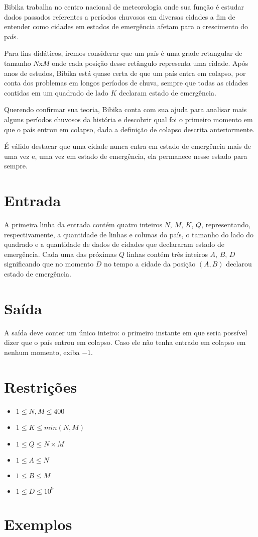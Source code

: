 Bibika trabalha no centro nacional de meteorologia onde sua função é estudar dados passados referentes a períodos chuvosos em diversas cidades a
fim de entender como cidades em estados de emergência afetam para o crescimento do país.

Para fins didáticos, iremos considerar que um país é uma grade retangular de tamanho $N$x$M$ onde cada posição desse retângulo representa uma cidade.
Após anos de estudos, Bibika está quase certa de que um país entra em colapso, por conta dos problemas em longos períodos de chuva, sempre que todas
as cidades contidas em um quadrado de lado $K$ declaram estado de emergência.

Querendo confirmar sua teoria, Bibika conta com sua ajuda para analisar mais alguns períodos chuvosos da história e descobrir qual foi o primeiro momento
em que o país entrou em colapso, dada a definição de colapso descrita anteriormente.

É válido destacar que uma cidade nunca entra em estado de emergência mais de uma vez e, uma vez em estado de emergência, ela permanece nesse estado para sempre.

\section*{Entrada}

A primeira linha da entrada contém quatro inteiros $N$, $M$, $K$, $Q$, representando, respectivamente, a quantidade de linhas e colunas do país,
o tamanho do lado do quadrado e a quantidade de dados de cidades que declararam estado de emergência.
Cada uma das próximas $Q$ linhas contém três inteiros $A$, $B$, $D$ significando que no momento $D$ no tempo a cidade da posição $(A,B)$ declarou estado
de emergência.

\section*{Saída}

A saída deve conter um único inteiro: o primeiro instante em que seria possível dizer que o país entrou em colapso.
Caso ele não tenha entrado em colapso em nenhum momento, exiba $-1$.

\section*{Restrições}

\begin{itemize}
\item $1 \leq N, M \leq 400$
\item $1 \leq K \leq min(N, M)$
\item $1 \leq Q \leq N \times M$
\item $1 \leq A \leq N$
\item $1 \leq B \leq M$
\item $1 \leq D \leq 10^9$
\end{itemize}


\section*{Exemplos}

\exemplo

